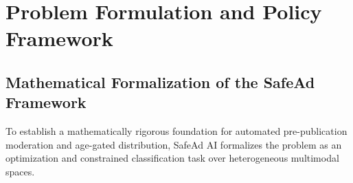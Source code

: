 \documentclass[12pt,a4paper]{report}
\begin{document}

\chapter{Problem Formulation and Policy Framework}

\section{Mathematical Formalization of the SafeAd Framework}

To establish a mathematically rigorous foundation for automated pre-publication moderation and age-gated distribution, SafeAd AI formalizes the problem as an optimization and constrained classification task over heterogeneous multimodal spaces.
\end{document}
